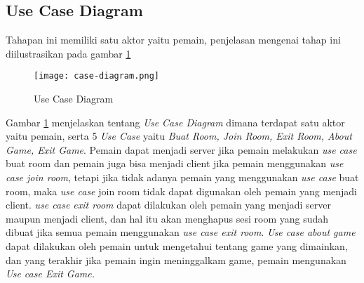 

\subsection{Use Case Diagram}
Tahapan ini memiliki satu aktor yaitu pemain, penjelasan mengenai tahap ini diilustrasikan pada gambar \ref{fig:case-diagram}

\begin{figure}[h]
    \centering
    \texttt{[image: case-diagram.png]}
    \caption{Use Case Diagram}
    \label{fig:case-diagram}
\end{figure}

    Gambar \ref{fig:case-diagram} menjelaskan tentang \textit{Use Case Diagram} dimana terdapat satu aktor yaitu pemain, serta 5 \textit{Use Case} yaitu \textit{Buat Room, Join Room, Exit Room, About Game, Exit Game}.
Pemain dapat menjadi server jika pemain melakukan \textit{use case} buat room dan pemain juga bisa menjadi client jika pemain menggunakan \textit{use case join room}, tetapi jika tidak adanya pemain yang menggunakan \textit{use case} buat room, maka \textit{use case} join room tidak dapat digunakan oleh pemain yang menjadi client.
\textit{use case exit room} dapat dilakukan oleh pemain yang menjadi server maupun menjadi client, dan hal itu akan menghapus sesi room yang sudah dibuat jika semua pemain menggunakan \textit{use case exit room}. \textit{Use case about game} dapat dilakukan oleh pemain untuk mengetahui tentang game yang dimainkan, dan yang terakhir jika pemain ingin meninggalkam game, pemain mengunakan \textit{Use case Exit Game.}
